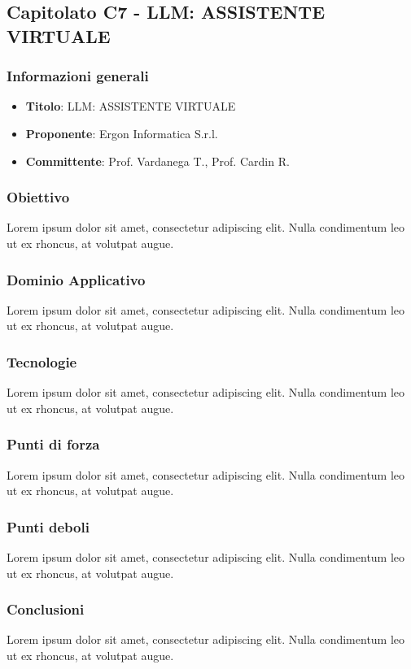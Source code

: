 \subsection{Capitolato C7 - LLM: ASSISTENTE VIRTUALE}
     \subsubsection{Informazioni generali}
        \begin{itemize}
            \item \textbf{Titolo}: LLM: ASSISTENTE VIRTUALE
            \item \textbf{Proponente}: Ergon Informatica S.r.l.
            \item \textbf{Committente}: Prof. Vardanega T., Prof. Cardin R.
        \end{itemize}
    \subsubsection{Obiettivo}
    Lorem ipsum dolor sit amet, consectetur adipiscing elit. Nulla condimentum leo ut ex rhoncus, at volutpat augue.
     \subsubsection{Dominio Applicativo}
    Lorem ipsum dolor sit amet, consectetur adipiscing elit. Nulla condimentum leo ut ex rhoncus, at volutpat augue.
    \subsubsection{Tecnologie}
    Lorem ipsum dolor sit amet, consectetur adipiscing elit. Nulla condimentum leo ut ex rhoncus, at volutpat augue.
    \subsubsection{Punti di forza}
    Lorem ipsum dolor sit amet, consectetur adipiscing elit. Nulla condimentum leo ut ex rhoncus, at volutpat augue.
    \subsubsection{Punti deboli}
    Lorem ipsum dolor sit amet, consectetur adipiscing elit. Nulla condimentum leo ut ex rhoncus, at volutpat augue.
    \subsubsection{Conclusioni}
    Lorem ipsum dolor sit amet, consectetur adipiscing elit. Nulla condimentum leo ut ex rhoncus, at volutpat augue.